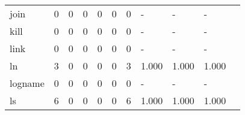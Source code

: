 \begin{longtable}{lp{1.20cm}p{1.20cm}p{1.20cm}p{1.20cm}p{1.20cm}p{1.20cm}p{1.20cm}p{1.20cm}p{1.20cm}p{1.20cm}}
join      &                                     0 &                                                  0 &                                                  0 &                                                  0 &                                                  0 &                                                  0 &                                             - &                                                  - &                                                  - \\
kill      &                                     0 &                                                  0 &                                                  0 &                                                  0 &                                                  0 &                                                  0 &                                             - &                                                  - &                                                  - \\
link      &                                     0 &                                                  0 &                                                  0 &                                                  0 &                                                  0 &                                                  0 &                                             - &                                                  - &                                                  - \\
ln        &                                     3 &                                                  0 &                                                  0 &                                                  0 &                                                  0 &                                                  3 &                                         1.000 &                                              1.000 &                                              1.000 \\
logname   &                                     0 &                                                  0 &                                                  0 &                                                  0 &                                                  0 &                                                  0 &                                             - &                                                  - &                                                  - \\
ls        &                                     6 &                                                  0 &                                                  0 &                                                  0 &                                                  0 &                                                  6 &                                         1.000 &                                              1.000 &                                              1.000 \\

\end{longtable}
